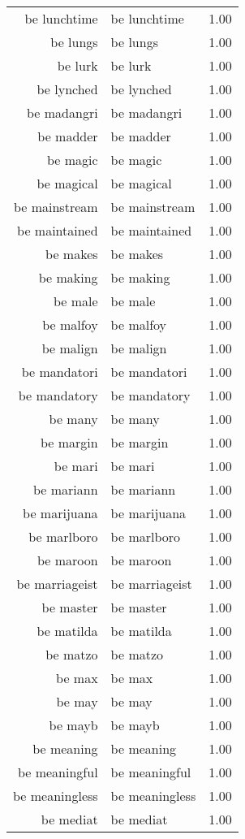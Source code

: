 \begin{table}[ht]
\begin{tabular}{rlr}
  be lunchtime & be lunchtime & 1.00 \\ 
  be lungs & be lungs & 1.00 \\ 
  be lurk & be lurk & 1.00 \\ 
  be lynched & be lynched & 1.00 \\ 
  be madangri & be madangri & 1.00 \\ 
  be madder & be madder & 1.00 \\ 
  be magic & be magic & 1.00 \\ 
  be magical & be magical & 1.00 \\ 
  be mainstream & be mainstream & 1.00 \\ 
  be maintained & be maintained & 1.00 \\ 
  be makes & be makes & 1.00 \\ 
  be making & be making & 1.00 \\ 
  be male & be male & 1.00 \\ 
  be malfoy & be malfoy & 1.00 \\ 
  be malign & be malign & 1.00 \\ 
  be mandatori & be mandatori & 1.00 \\ 
  be mandatory & be mandatory & 1.00 \\ 
  be many & be many & 1.00 \\ 
  be margin & be margin & 1.00 \\ 
  be mari & be mari & 1.00 \\ 
  be mariann & be mariann & 1.00 \\ 
  be marijuana & be marijuana & 1.00 \\ 
  be marlboro & be marlboro & 1.00 \\ 
  be maroon & be maroon & 1.00 \\ 
  be marriageist & be marriageist & 1.00 \\ 
  be master & be master & 1.00 \\ 
  be matilda & be matilda & 1.00 \\ 
  be matzo & be matzo & 1.00 \\ 
  be max & be max & 1.00 \\ 
  be may & be may & 1.00 \\ 
  be mayb & be mayb & 1.00 \\ 
  be meaning & be meaning & 1.00 \\ 
  be meaningful & be meaningful & 1.00 \\ 
  be meaningless & be meaningless & 1.00 \\ 
  be mediat & be mediat & 1.00 \\ 

\end{tabular}
\end{table}
